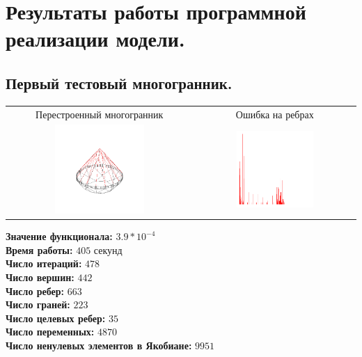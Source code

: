 \documentclass[14pt,fleqn,a4paper]{scrartcl}
\begin{document}
\section{Результаты работы программной реализации модели.}

\subsection{Первый тестовый многогранник.}
\begin{center}
\begin{tabular}{|c|c|}
\hline
Перестроенный многогранник & Ошибка на ребрах\\
\includegraphics[width=0.5\textwidth]{bigout1.png} &
\includegraphics[width=0.5\textwidth]{bigerror1.png} \\ 
\hline
\end{tabular}
\end{center}
\textbf{Значение функционала:} $3.9*10^{-4}$\\
\textbf{Время работы:} $405$ секунд\\
\textbf{Число итераций:} $478$\\
\textbf{Число вершин:} $442$\\
\textbf{Число ребер:} $663$\\
\textbf{Число граней:} $223$\\
\textbf{Число целевых ребер:} $35$ \\
\textbf{Число переменных:} $4870$\\
\textbf{Число ненулевых элементов в Якобиане:} $9951$\\
\newpage
\end{document}
